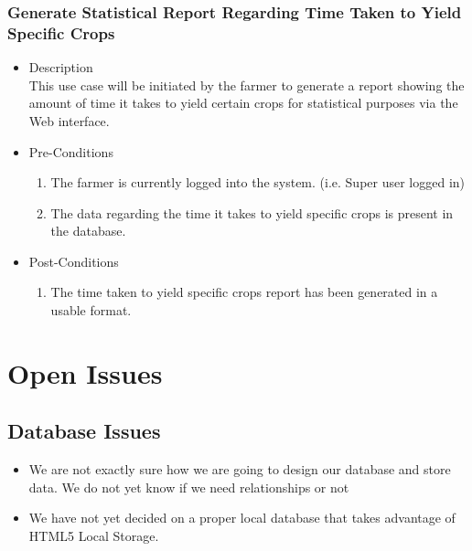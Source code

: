 \documentclass[11pt,fleqn]{book} %
\begin{document}
	\subsection{Generate Statistical Report Regarding Time Taken to Yield Specific Crops}
	\begin{itemize}
		\item Description\\
		This use case will be initiated by the farmer to generate a report showing the amount of time it takes to yield certain crops for statistical purposes via the Web interface.
		\item Pre-Conditions
		\begin{enumerate}
			\item The farmer is currently logged into the system. (i.e. Super user logged in)
			\item The data regarding the time it takes to yield specific crops is present in the database.
		\end{enumerate}
		\item Post-Conditions
		\begin{enumerate}
			\item The time taken to yield specific crops report has been generated in a usable format.
		\end{enumerate}
	\end{itemize}
	
	
	
	\chapter{Open Issues}
	
	\section{Database Issues}
	\begin{itemize}
		\item We are not exactly sure how we are going to design our database and store data. We do not yet know if we need relationships or not
		\item We have not yet decided on a proper local database that takes advantage of HTML5 Local Storage.
	\end{itemize}
	
\end{document}

